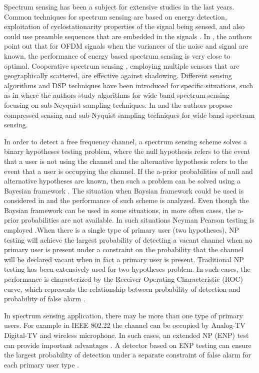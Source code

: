 \documentclass[12pt,journal,a4paper,twoside,onecolumn]{IEEEtran}
\begin{document}
\begin{spacing}{2}
 Spectrum sensing has been a subject for extensive studies in the last years\cite{axell2012spectrum}. Common techniques for spectrum sensing are based on energy detection, exploitation of cyclostationarity properties of  the signal being sensed, and also could use preamble sequences that are embedded in the signals \cite{cabric2004implementation}.  In \cite{axell2011optimal}, the authors point out that for OFDM signals when the variances of the noise and signal are known, the performance of energy based spectrum sensing is very close to optimal. Cooperative spectrum sensing \cite{ganesan2005cooperative}, employing multiple sensors that are geographically scattered, are effective against shadowing.
Different sensing algorithms and DSP techniques have been introduced for specific situations, such as in \cite{tian2007compressed} where the authors study algorithms for wide band spectrum sensing focusing on sub-Neyquist sampling techniques. In  \cite{sun2013wideband} and  \cite{sun2013wideband2} the authors propose compressed sensing and sub-Nyquist sampling techniques for wide band spectrum sensing.

In order to detect a free frequency channel, a spectrum sensing scheme solves a binary hypotheses testing problem, where the null hypothesis refers to the event that a user is not using the channel and the alternative hypothesis refers to the event that a user is occupying the channel. If the a-prior probabilities of null and alternative hypotheses are known, then such a problem can be solved using a Bayesian framework \cite{poor1994introduction}. The situation when Baysian framework could be used is considered in \cite{zeng2010review} and the performance of such scheme is analyzed.
Even though the Baysian framework can be used in some situations, in more often cases, the a-prior probabilities are not available. In such situations Neyman Pearson testing is employed \cite{poor1994introduction}.When there is a single type of primary user (two hypotheses), NP testing will achieve the largest probability of detecting a vacant channel when no primary user is present under a constraint on the probability that the channel will be declared vacant when in fact a primary user is present.
Traditional NP testing has been extensively used for two hypotheses problem. In such cases,  the performance is characterized by the Receiver Operating Characteristic (ROC) curve, which represents the relationship between probability of detection and probability of false alarm \cite{poor1994introduction}.

In spectrum sensing application, there may be more than one type of primary users. For example in IEEE 802.22 \cite{shellhammer2008spectrum} the channel can be occupied by Analog-TV Digital-TV and wireless microphone. In such cases, an extended NP (ENP) test can provide important advantages \cite{zhang1999desig}. A detector based on ENP testing can ensure the largest probability of detection under a separate constraint of false alarm for each primary user type \cite{LehmannTest}.


\end{spacing}
\end{document}
